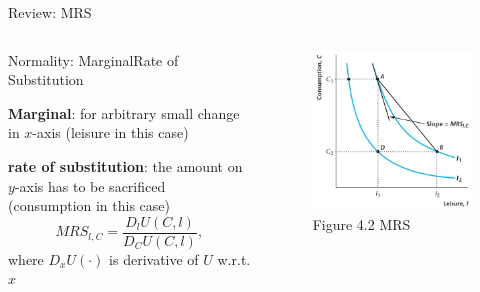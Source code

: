 \documentclass[11pt,aspectratio=169,usenames,dvipsnames]{beamer}
\let\tempone\itemize
\let\temptwo\enditemize
\renewenvironment{itemize}{\tempone\addtolength{\itemsep}{\fill}}{\temptwo}
\begin{document}
\begin{frame}{Review: MRS}
\label{slide:Review__MRS}
    \begin{columns}
        \begin{column}{0.5\textwidth}
            \begin{itemize}
                \item \alert{Normality}: M{\tiny arginal}R{\tiny ate of }S{\tiny ubstitution}
                \begin{itemize}
                    \item \textbf{Marginal}: for \alert{arbitrary small} change in $ x $-axis (leisure in this case)
                    \item \textbf{rate of substitution}: the amount on $ y $-axis has to be sacrificed (consumption in this case)
                \end{itemize}
                \begin{equation}
                \label{eq:MRS}
                    MRS_{l, C} = \frac{D_{l} U( C, l )}{D_{C}U( C, l )}
                ,\end{equation}
                where $ D_{x}U( \cdot ) $ is derivative of $ U $ w.r.t. $ x $
            \end{itemize}
        \end{column}
        \begin{column}{0.5\textwidth}
        \begin{figure}
            \caption{Figure 4.2 MRS}
            \includegraphics[width=.8\textwidth]{./figures/Figure4_2.jpg}
        \end{figure}
        \end{column}
    \end{columns}
\end{frame}
\end{document}
